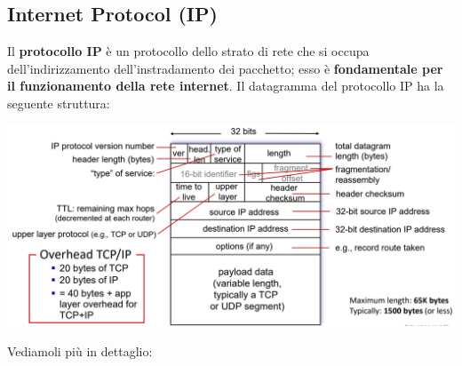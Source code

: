 \documentclass[12pt]{article}
\begin{document}
\subsection{Internet Protocol (IP)}
Il \textbf{protocollo IP} è un protocollo dello strato di rete che si occupa dell'indirizzamento dell'instradamento dei pacchetto; esso è \textbf{fondamentale per il funzionamento della rete internet}.
Il datagramma del protocollo IP ha la seguente struttura:
\begin{center}
    \includegraphics[width = 1\linewidth]{Images/82.png}
\end{center}
Vediamoli più in dettaglio:
\end{document}
